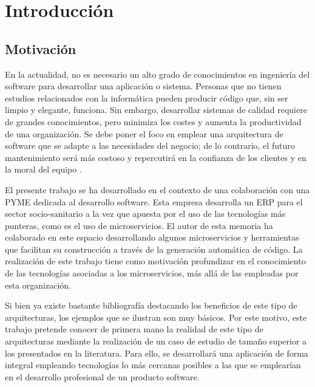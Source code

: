 \documentclass[11pt,spanish,listoffigures]{tfgetsinf}
\begin{document}

\mainmatter


\chapter{Introducci\'on}

\section{Motivaci\'on}

En la actualidad, no es necesario un alto grado de conocimientos en ingeniería del software para desarrollar una aplicación o sistema. Personas que no tienen estudios relacionados con la informática pueden producir código que, sin ser limpio y elegante, funciona. Sin embargo, desarrollar sistemas de calidad requiere de grandes conocimientos, pero minimiza los costes y aumenta la productividad de una organización. Se debe poner el foco en emplear una arquitectura de software que se adapte a las necesidades del negocio; de lo contrario, el futuro mantenimiento será más costoso y repercutirá en la confianza de los clientes y en la moral del equipo \cite{Martin2017}.

El presente trabajo se ha desarrollado en el contexto de una colaboración con una PYME dedicada al desarrollo software. Esta empresa desarrolla un ERP para el sector socio-sanitario a la vez que apuesta por el uso de las tecnologías más punteras, como es el uso de microservicios. El autor de esta memoria ha colaborado en este espacio desarrollando algunos microservicios y herramientas que facilitan su construcción a través de la generación automática de código. La realización de este trabajo tiene como motivación profundizar en el conocimiento de las tecnologías asociadas a los microservicios, más allá de las empleadas por esta organización.

Si bien ya existe bastante bibliografía destacando los beneficios de este tipo de arquitecturas, los ejemplos que se ilustran son muy básicos. Por este motivo, este trabajo pretende conocer de primera mano la realidad de este tipo de arquitecturas mediante la realización de un caso de estudio de tamaño superior a los presentados en la literatura. Para ello, se desarrollará una aplicación de forma integral empleando tecnologías lo más cercanas posibles a las que se emplearían en el desarrollo profesional de un producto software.
\end{document}
